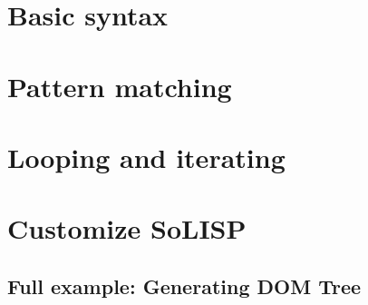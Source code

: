 \documentclass[a4paper,11pt]{article}
\begin{document}
\section{Basic syntax}


\section{Pattern matching}


\section{Looping and iterating}


\section{Customize SoLISP}


\begin{appendix}

\section{Full example: Generating DOM Tree}
\label{full_example}

\end{appendix}
\end{document}
